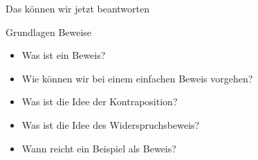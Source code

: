 \begin{frame}[fragile]{Das können wir jetzt beantworten}
	\begin{alertblock}{Grundlagen Beweise}
		\begin{itemize}
			\item Was ist ein Beweis?
			\item Wie können wir bei einem einfachen Beweis vorgehen?
			\item Was ist die Idee der Kontraposition?
			\item Was ist die Idee des Widerspruchsbeweis?
			\item Wann reicht ein Beispiel als Beweis?
		\end{itemize}
	\end{alertblock}
\end{frame}